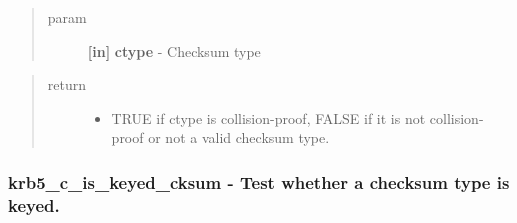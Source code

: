 \documentclass[letterpaper,10pt,english]{sphinxmanual}
\begin{document}
\begin{fulllineitems}
\label{appdev/refs/api/krb5_c_is_coll_proof_cksum:krb5_c_is_coll_proof_cksum}
\end{fulllineitems}

\begin{quote}\begin{description}
\item[{param}] \leavevmode
\textbf{{[}in{]}} \textbf{ctype} - Checksum type

\end{description}\end{quote}
\begin{quote}\begin{description}
\item[{return}] \leavevmode\begin{itemize}
\item {} 
TRUE if ctype is collision-proof, FALSE if it is not collision-proof or not a valid checksum type.

\end{itemize}

\end{description}\end{quote}


\subsubsection{krb5\_c\_is\_keyed\_cksum -  Test whether a checksum type is keyed.}
\label{appdev/refs/api/krb5_c_is_keyed_cksum::doc}\label{appdev/refs/api/krb5_c_is_keyed_cksum:krb5-c-is-keyed-cksum-test-whether-a-checksum-type-is-keyed}

\begin{fulllineitems}
\label{appdev/refs/api/krb5_c_is_keyed_cksum:krb5_c_is_keyed_cksum}
\end{fulllineitems}
\end{document}
